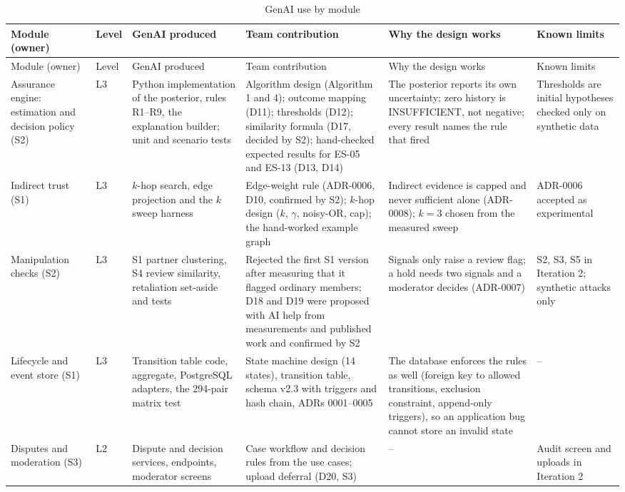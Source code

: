 \begingroup\small
\begin{longtable}{@{}L{56pt}L{21pt}L{68pt}L{98pt}L{69pt}L{43pt}@{}}
\caption{GenAI use by module}\label{tab:genai-use-module}\\
\toprule
Module (owner) & Level & GenAI produced & Team contribution & Why the design works & Known limits \\
\midrule
\endfirsthead
\toprule
Module (owner) & Level & GenAI produced & Team contribution & Why the design works & Known limits \\
\midrule
\endhead
\bottomrule
\endlastfoot
Assurance engine: estimation and decision policy (S2) & L3 & Python implementation of the posterior, rules R1--R9, the explanation builder; unit and scenario tests & Algorithm design (Algorithm 1 and 4); outcome mapping (D11); thresholds (D12); similarity formula (D17, decided by S2); hand-checked expected results for ES-05 and ES-13 (D13, D14) & The posterior reports its own uncertainty; zero history is INSUFFICIENT, not negative; every result names the rule that fired & Thresholds are initial hypotheses checked only on synthetic data \\
Indirect trust (S1) & L3 & $k$-hop search, edge projection and the $k$ sweep harness & Edge-weight rule (ADR-0006, D10, confirmed by S2); $k$-hop design ($k$, $\gamma$, noisy-OR, cap); the hand-worked example graph & Indirect evidence is capped and never sufficient alone (ADR-0008); $k=3$ chosen from the measured sweep & ADR-0006 accepted as experimental \\
Manipulation checks (S2) & L3 & S1 partner clustering, S4 review similarity, retaliation set-aside and tests & Rejected the first S1 version after measuring that it flagged ordinary members; D18 and D19 were proposed with AI help from measurements and published work and confirmed by S2 & Signals only raise a review flag; a hold needs two signals and a moderator decides (ADR-0007) & S2, S3, S5 in Iteration 2; synthetic attacks only \\
Lifecycle and event store (S1) & L3 & Transition table code, aggregate, PostgreSQL adapters, the 294-pair matrix test & State machine design (14 states), transition table, schema v2.3 with triggers and hash chain, ADRs 0001--0005 & The database enforces the rules as well (foreign key to allowed transitions, exclusion constraint, append-only triggers), so an application bug cannot store an invalid state & -- \\
Disputes and moderation (S3) & L2 & Dispute and decision services, endpoints, moderator screens & Case workflow and decision rules from the use cases; upload deferral (D20, S3) & -- & Audit screen and uploads in Iteration 2 \\

\end{longtable}
